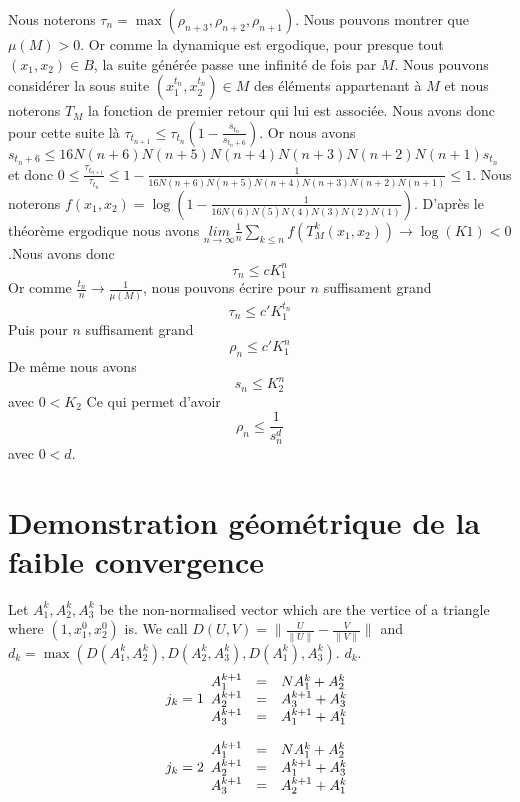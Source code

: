 \documentclass[12pt]{article}
\theoremstyle{plain}%
\theoremstyle{definition}
\theoremstyle{remark}
\begin{document}
Nous noterons $\tau_n=\max{(\rho_{n+3},\rho_{n+2},\rho_{n+1})}$.\newline
Nous pouvons montrer que $\mu(M)>0$. Or comme la dynamique est ergodique, pour presque tout $(x_1,x_2) \in B$, la suite générée passe une infinité de fois par $M$. Nous pouvons considérer la sous suite $(x_1^{t_n},x_2^{t_n})\in M$ des éléments appartenant à $M$ et nous noterons $T_M$ la fonction de premier retour qui lui est associée. Nous avons donc pour cette suite là $\tau_{t_{n+1}} \leq \tau_{t_{n}}(1-\frac{s_{t_n}}{s_{t_n+6}})$. \newline
Or nous avons $s_{t_n+6} \leq 16 N(n+6)N(n+5)N(n+4)N(n+3)N(n+2)N(n+1)s_{t_n}$ et donc $0 \leq \frac{\tau_{t_{n+1}}}{\tau_{t_{n}}} \leq 1-\frac{1}{16 N(n+6)N(n+5)N(n+4)N(n+3)N(n+2)N(n+1)} \leq 1$. Nous noterons $f(x_1,x_2)=\log(1-\frac{1}{16 N(6)N(5)N(4)N(3)N(2)N(1)})$.
D'après le théorème ergodique nous avons $\underset{n \to \infty}{lim}\frac{1}{n}\sum_{k \leq n}f(T_M^k(x_1,x_2)) \to \log(K1) <0$.Nous avons donc\[
\tau_n \leq c K_1^{n}
\]
Or comme $\frac{t_n}{n} \to \frac{1}{\mu(M)}$, nous pouvons écrire pour $n$ suffisament grand\[
\tau_n \leq c' K_1^{t_n}
\]
Puis pour $n$ suffisament grand\[
\rho_n \leq c' K_1^n
\]
De même nous avons\[
s_n \leq K_2^n
\]
avec $0<K_2$ Ce qui permet d'avoir \[
\rho_n \leq \frac{1}{s_n^d}
\]avec $0<d$.

\section{Demonstration géométrique de la faible convergence}

Let $A_1^k,A_2^k,A_3^k$ be the non-normalised vector which are the vertice of a triangle where $(1,x_1^0,x_2^0)$ is. \newline
We call $D(U,V)=\|\frac{U}{\|U \|}- \frac{V}{\|V\|}\|$ and $d_k=\max(D(A_1^k,A_2^k),D(A_2^k,A_3^k),D(A_1^k),A_3^k)$. $d_k$.
\[j_k=1
\begin{array}{c c l}
A_1^{k+1} & = & N A_1^k+A_2^k\\
A_2^{k+1} & = & A_3^{k+1} + A_3^k \\
A_3^{k+1} & = & A_1^{k+1} + A_1^k
\end{array}
\]

\[j_k=2
\begin{array}{c c l}
A_1^{k+1} & = & N A_1^k+A_2^k\\
A_2^{k+1} & = & A_1^{k+1} + A_3^k \\
A_3^{k+1} & = & A_2^{k+1} + A_1^k
\end{array}
\]
\end{document}
